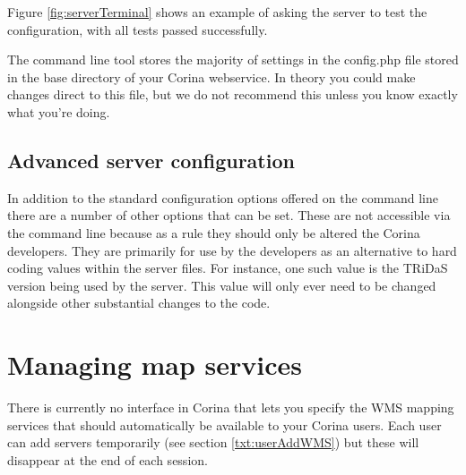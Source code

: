 Figure \ref{fig:serverTerminal} shows an example of asking the server to test the configuration, with all tests passed successfully.

The command line tool stores the majority of settings in the config.php file stored in the base directory of your Corina webservice.  In theory you could make changes direct to this file, but we do not recommend this unless you know exactly what you're doing.


\subsection{Advanced server configuration}

In addition to the standard configuration options offered on the command line there are a number of other options that can be set.  These are not accessible via the command line because as a rule they should only be altered the Corina developers.  They are primarily for use by the developers as an alternative to hard coding values within the server files.  For instance, one such value is the TRiDaS version being used by the server.  This value will only ever need to be changed alongside other substantial changes to the code.  




\section{Managing map services}
\label{txt:managingmaps}

There is currently no interface in Corina that lets you specify the WMS mapping services that should automatically be available to your Corina users.  Each user can add servers temporarily (see section \ref{txt:userAddWMS}) but these will disappear at the end of each session.  
